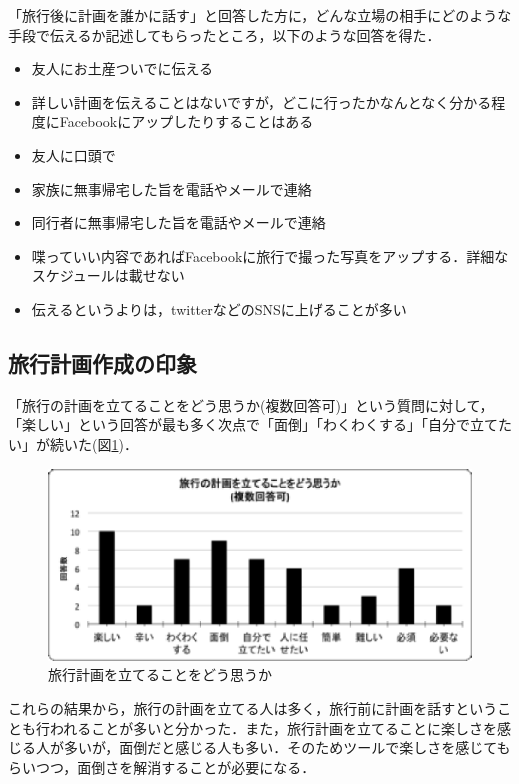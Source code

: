 \documentclass{funthesis}
\begin{document}
「旅行後に計画を誰かに話す」と回答した方に，どんな立場の相手にどのような手段で伝えるか記述してもらったところ，以下のような回答を得た．
\begin{itemize}
 \item 友人にお土産ついでに伝える
 \item 詳しい計画を伝えることはないですが，どこに行ったかなんとなく分かる程度にFacebookにアップしたりすることはある
 \item 友人に口頭で
 \item 家族に無事帰宅した旨を電話やメールで連絡
 \item 同行者に無事帰宅した旨を電話やメールで連絡
 \item 喋っていい内容であればFacebookに旅行で撮った写真をアップする．詳細なスケジュールは載せない
 \item 伝えるというよりは，twitterなどのSNSに上げることが多い
\end{itemize}



\subsection{旅行計画作成の印象}

「旅行の計画を立てることをどう思うか(複数回答可)」という質問に対して，「楽しい」という回答が最も多く次点で「面倒」「わくわくする」「自分で立てたい」が続いた(図\ref{Lhowthinktrip})．


\begin{figure}[htpb]
\begin{center}
\includegraphics[scale=0.7]{howthinktrip.eps}
\end{center}
\caption{旅行計画を立てることをどう思うか}
\label{Lhowthinktrip}
\end{figure}

これらの結果から，旅行の計画を立てる人は多く，旅行前に計画を話すということも行われることが多いと分かった．また，旅行計画を立てることに楽しさを感じる人が多いが，面倒だと感じる人も多い．そのためツールで楽しさを感じてもらいつつ，面倒さを解消することが必要になる．\\
\end{document}
